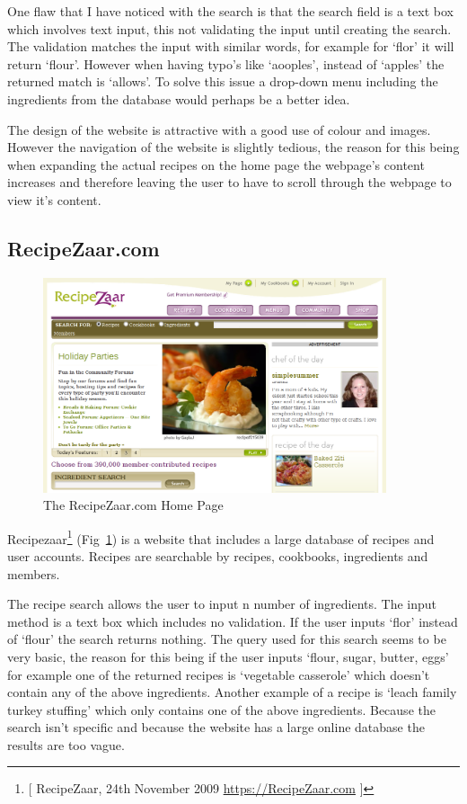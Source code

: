 One flaw that I have noticed with the search is that the search field is a text box which involves text input, this not validating the input until creating the search. The validation matches the input with similar words, for example for ‘flor’ it will return ‘flour’. However when having typo’s like ‘aooples’, instead of ‘apples’ the returned match is ‘allows’. To solve this issue a drop-down menu including the ingredients from the database would perhaps be a better idea.

The design of the website is attractive with a good use of colour and images. However the navigation of the website is slightly tedious, the reason for this being when expanding the actual recipes on the home page the webpage’s content increases and therefore leaving the user to have to scroll through the webpage to view it’s content.

\subsection{RecipeZaar.com}

\begin{figure}[h]
\includegraphics[width=0.9\textwidth]{screenshot_recipezaar}
\caption{The RecipeZaar.com Home Page}
\label{fig:recipezaar}
\end{figure}

Recipezaar\footnote{[ RecipeZaar, 24th November 2009 \url{https://RecipeZaar.com} ]} (Fig~\ref{fig:recipezaar}) is a website that includes a large database of recipes and user accounts. Recipes are searchable by recipes, cookbooks, ingredients and members. 

The recipe search allows the user to input n number of ingredients. The input method is a text box which includes no validation. If the user inputs ‘flor’ instead of ‘flour’ the search returns nothing. The query used for this search seems to be very basic, the reason for this being if the user inputs ‘flour, sugar, butter, eggs’ for example one of the returned recipes is ‘vegetable casserole’ which doesn’t contain any of the above ingredients. Another example of a recipe is ‘leach family turkey stuffing’ which only contains one of the above ingredients. Because the search isn’t specific and because the website has a large online database the results are too vague.

